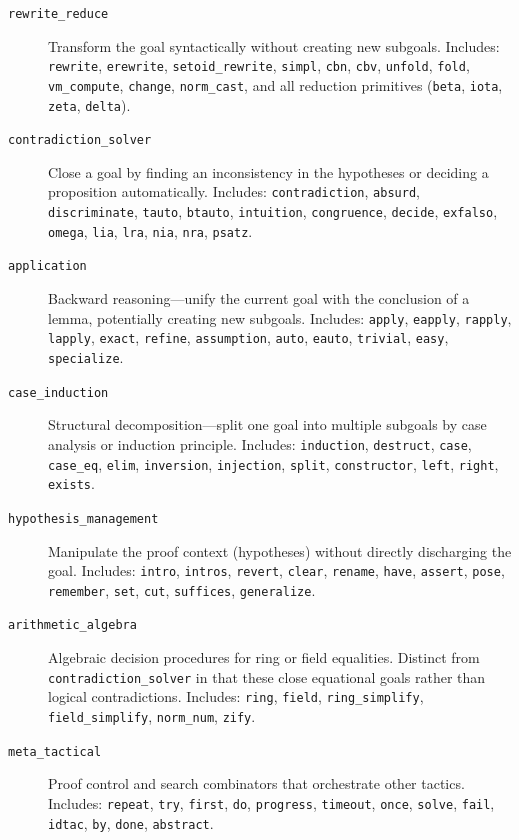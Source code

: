\documentclass[11pt]{article}
\begin{document}
\begin{description}
  \item[\texttt{rewrite\_reduce}] Transform the goal syntactically without creating new subgoals. Includes: \texttt{rewrite}, \texttt{erewrite}, \texttt{setoid\_rewrite}, \texttt{simpl}, \texttt{cbn}, \texttt{cbv}, \texttt{unfold}, \texttt{fold}, \texttt{vm\_compute}, \texttt{change}, \texttt{norm\_cast}, and all reduction primitives (\texttt{beta}, \texttt{iota}, \texttt{zeta}, \texttt{delta}).
  \item[\texttt{contradiction\_solver}] Close a goal by finding an inconsistency in the hypotheses or deciding a proposition automatically. Includes: \texttt{contradiction}, \texttt{absurd}, \texttt{discriminate}, \texttt{tauto}, \texttt{btauto}, \texttt{intuition}, \texttt{congruence}, \texttt{decide}, \texttt{exfalso}, \texttt{omega}, \texttt{lia}, \texttt{lra}, \texttt{nia}, \texttt{nra}, \texttt{psatz}.
  \item[\texttt{application}] Backward reasoning---unify the current goal with the conclusion of a lemma, potentially creating new subgoals. Includes: \texttt{apply}, \texttt{eapply}, \texttt{rapply}, \texttt{lapply}, \texttt{exact}, \texttt{refine}, \texttt{assumption}, \texttt{auto}, \texttt{eauto}, \texttt{trivial}, \texttt{easy}, \texttt{specialize}.
  \item[\texttt{case\_induction}] Structural decomposition---split one goal into multiple subgoals by case analysis or induction principle. Includes: \texttt{induction}, \texttt{destruct}, \texttt{case}, \texttt{case\_eq}, \texttt{elim}, \texttt{inversion}, \texttt{injection}, \texttt{split}, \texttt{constructor}, \texttt{left}, \texttt{right}, \texttt{exists}.
  \item[\texttt{hypothesis\_management}] Manipulate the proof context (hypotheses) without directly discharging the goal. Includes: \texttt{intro}, \texttt{intros}, \texttt{revert}, \texttt{clear}, \texttt{rename}, \texttt{have}, \texttt{assert}, \texttt{pose}, \texttt{remember}, \texttt{set}, \texttt{cut}, \texttt{suffices}, \texttt{generalize}.
  \item[\texttt{arithmetic\_algebra}] Algebraic decision procedures for ring or field equalities. Distinct from \texttt{contradiction\_solver} in that these close equational goals rather than logical contradictions. Includes: \texttt{ring}, \texttt{field}, \texttt{ring\_simplify}, \texttt{field\_simplify}, \texttt{norm\_num}, \texttt{zify}.
  \item[\texttt{meta\_tactical}] Proof control and search combinators that orchestrate other tactics. Includes: \texttt{repeat}, \texttt{try}, \texttt{first}, \texttt{do}, \texttt{progress}, \texttt{timeout}, \texttt{once}, \texttt{solve}, \texttt{fail}, \texttt{idtac}, \texttt{by}, \texttt{done}, \texttt{abstract}.
\end{description}
\end{document}
